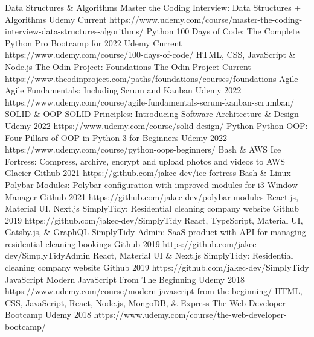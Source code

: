 \begin{cvhonors}
  \cvhonor
    {Data Structures \& Algorithms}
    {Master the Coding Interview: Data Structures + Algorithms}
    {Udemy}
    {Current}
    {https://www.udemy.com/course/master-the-coding-interview-data-structures-algorithms/}
  \cvhonor
    {Python}
    {100 Days of Code: The Complete Python Pro Bootcamp for 2022}
    {Udemy}
    {Current}
    {https://www.udemy.com/course/100-days-of-code/}
  \cvhonor
    {HTML, CSS, JavaScript \& Node.js}
    {The Odin Project: Foundations}
    {The Odin Project}
    {Current}
    {https://www.theodinproject.com/paths/foundations/courses/foundations}
  \cvhonor
    {Agile}
    {Agile Fundamentals: Including Scrum and Kanban}
    {Udemy}
    {2022}
    {https://www.udemy.com/course/agile-fundamentals-scrum-kanban-scrumban/}
  \cvhonor
    {SOLID \& OOP}
    {SOLID Principles: Introducing Software Architecture \& Design}
    {Udemy}
    {2022}
    {https://www.udemy.com/course/solid-design/}
  \cvhonor
    {Python}
    {Python OOP: Four Pillars of OOP in Python 3 for Beginners}
    {Udemy}
    {2022}
    {https://www.udemy.com/course/python-oops-beginners/}
  \cvhonor
    {Bash \& AWS}
    {Ice Fortress: Compress, archive, encrypt and upload photos and videos to AWS Glacier}
    {Github}
    {2021}
    {https://github.com/jakec-dev/ice-fortress}
  \cvhonor
    {Bash \& Linux}
    {Polybar Modules: Polybar configuration with improved modules for i3 Window Manager}
    {Github}
    {2021}
    {https://github.com/jakec-dev/polybar-modules}
  \cvhonor
    {React.js, Material UI, Next.js}
    {SimplyTidy: Residential cleaning company website}
    {Github}
    {2019}
    {https://github.com/jakec-dev/SimplyTidy}
  \cvhonor
    {React, TypeScript, Material UI, Gatsby.js, \& GraphQL}
    {SimplyTidy Admin: SaaS product with API for managing residential cleaning bookings}
    {Github}
    {2019}
    {https://github.com/jakec-dev/SimplyTidyAdmin}
  \cvhonor
    {React, Material UI \& Next.js}
    {SimplyTidy: Residential cleaning company website}
    {Github}
    {2019}
    {https://github.com/jakec-dev/SimplyTidy}
  \cvhonor
    {JavaScript}
    {Modern JavaScript From The Beginning}
    {Udemy}
    {2018}
    {https://www.udemy.com/course/modern-javascript-from-the-beginning/}
  \cvhonor
    {HTML, CSS, JavaScript, React, Node.js, MongoDB, \& Express}
    {The Web Developer Bootcamp}
    {Udemy}
    {2018}
    {https://www.udemy.com/course/the-web-developer-bootcamp/}
\end{cvhonors}
